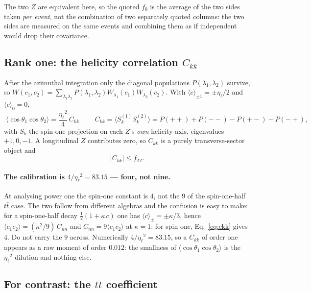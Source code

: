 \documentclass[a4paper,11pt]{article}
\providecommand{\etal}{\ensuremath{\eta_\ell}}          %
\providecommand{\ckk}{\ensuremath{C_{kk}}}              %
\providecommand{\cnn}{\ensuremath{C_{nn}}}              %
\begin{document}
The two $Z$ are equivalent here, so the quoted $f_0$ is the average of the two
sides taken \emph{per event}, not the combination of two separately quoted
columns: the two sides are measured on the same events and combining them as if
independent would drop their covariance.

\subsection{Rank one: the helicity correlation \texorpdfstring{$\ckk$}{Ckk}}
\label{subsec:spinobs_ckk}

After the azimuthal integration only the diagonal populations
$P(\lambda_1,\lambda_2)$ survive, so
$W(c_1,c_2)=\sum_{\lambda_1\lambda_2}P(\lambda_1,\lambda_2)
W_{\lambda_1}(c_1)W_{\lambda_2}(c_2)$. With $\langle c\rangle_{\pm1}=\pm\etal/2$
and $\langle c\rangle_0=0$,
\begin{equation}
  \boxed{\;\langle\cos\theta_1\cos\theta_2\rangle=\frac{\etal^2}{4}\,\ckk\;}
  \qquad
  \ckk=\big\langle S_k^{(1)}S_k^{(2)}\big\rangle=P(++)+P(--)-P(+-)-P(-+),
  \label{eq:ckk}
\end{equation}
with $S_k$ the spin-one projection on each $Z$'s \emph{own} helicity axis,
eigenvalues $+1,0,-1$. A longitudinal $Z$ contributes zero, so $\ckk$ is a
purely transverse-sector object and
\begin{equation}
  |\ckk|\le f_{TT}.
  \label{eq:ckkbound}
\end{equation}

\paragraph{The calibration is $4/\etal^2=83.15$ --- four, not nine.} At
analysing power one the spin-one constant is $4$, not the $9$ of the
spin-one-half $t\bar t$ case. The two follow from different algebras and the
confusion is easy to make: for a spin-one-half decay
$\frac12(1+\kappa\,c)$ one has $\langle c\rangle_\pm=\pm\kappa/3$, hence
$\langle c_1c_2\rangle=(\kappa^2/9)\,\cnn$ and $\cnn=9\langle c_1c_2\rangle$ at
$\kappa=1$; for spin one, Eq.~\eqref{eq:ckk} gives $4$. Do not carry the $9$
across. Numerically $4/\etal^2=83.15$, so a $\ckk$ of order one appears as a
raw moment of order $0.012$: the smallness of
$\langle\cos\theta_1\cos\theta_2\rangle$ is the $\etal^2$ dilution and nothing
else.

\subsection{For contrast: the \texorpdfstring{$t\bar t$}{ttbar} coefficient}
\label{subsec:spinobs_cnn}
\end{document}
